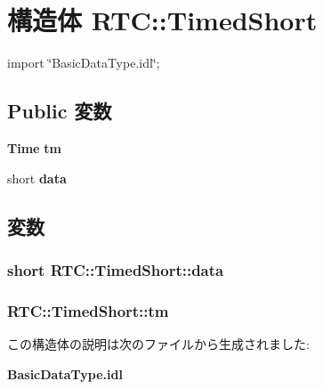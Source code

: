 \section{構造体 RTC::TimedShort}
\label{structRTC_1_1TimedShort}


{\ttfamily import \char`\"{}BasicDataType.idl\char`\"{};}

\subsection*{Public 変数}
\begin{DoxyCompactItemize}
\item 
{\bf Time} {\bf tm}
\item 
short {\bf data}
\end{DoxyCompactItemize}


\subsection{変数}
\subsubsection[{data}]{\setlength{\rightskip}{0pt plus 5cm}short {\bf RTC::TimedShort::data}}\label{structRTC_1_1TimedShort_ad8cbbe0261f33a05776440aec8d4a1b0}
\subsubsection[{tm}]{ {\bf RTC::TimedShort::tm}}\label{structRTC_1_1TimedShort_ad12428d96d25bedebdc9d710759bbc9e}


この構造体の説明は次のファイルから生成されました:\begin{DoxyCompactItemize}
\item 
{\bf BasicDataType.idl}\end{DoxyCompactItemize}
